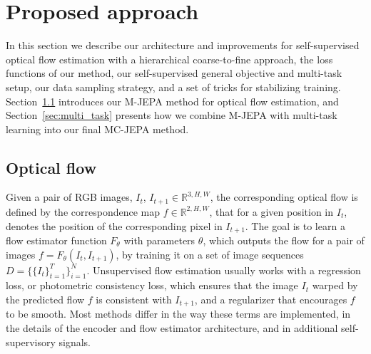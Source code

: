 \documentclass{article} %
\newcommand{\algospace}{MC-JEPA }
\newcommand{\parspace}{\vspace{0mm}}
\begin{document}
\section{Proposed approach}

In this section we describe our architecture and improvements for self-supervised optical flow estimation with a hierarchical coarse-to-fine approach, the loss functions of our method, our self-supervised general objective and multi-task setup, our data sampling strategy, and a set of tricks for stabilizing training. Section~\ref{sec:optical_flow} introduces our M-JEPA method for optical flow estimation, and Section~\ref{sec:multi_task} presents how we combine M-JEPA with multi-task learning into our final \algospace method.

\subsection{Optical flow} \label{sec:optical_flow}

Given a pair of RGB images, $I_{t}$, $I_{t+1} \in \mathbb{R}^{3,H,W}$, the corresponding optical flow is defined by the correspondence map $f \in \mathbb{R}^{2,H,W}$, that for a given position in $I_{t}$, denotes the position of the corresponding pixel in $I_{t+1}$. The goal is to learn a flow estimator function $F_{\theta}$ with parameters $\theta$, which outputs the flow for a pair of images $f = F_{\theta}(I_{t}, I_{t+1})$, by training it on a set of image sequences $D = \{\{I_{t}\}_{t=1}^{T}\}_{i=1}^{N}$. Unsupervised flow estimation usually works with a regression loss, or photometric consistency loss, which ensures that the image $I_{t}$ warped by the predicted flow $f$ is consistent with $I_{t+1}$, and a regularizer that encourages $f$ to be smooth. Most methods differ in the way these terms are implemented, in the details of the encoder and flow estimator architecture, and in additional self-supervisory signals.
\parspace
\end{document}
